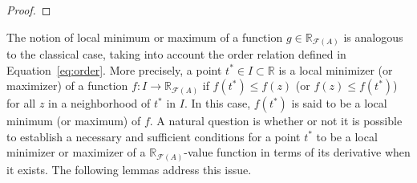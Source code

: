 \documentclass[12pt,a4paper]{article}
\newcommand{\RR}{\mathbb{R}}
\newcommand{\RFA}{\mathbb{R}_{\mathcal{F}(A)}}
\begin{document}
\begin{proof}
\end{proof}


The notion of local minimum or maximum of a function $g\in\RFA$ is analogous to the classical case, taking into account the order relation defined in Equation~\eqref{eq:order}. More precisely, a point $t^* \in I \subset \RR$ is  
a local minimizer (or maximizer) of a function $f:I\to \RFA$ if $f(t^*) \leq f(z)$ (or $f(z) \leq f(t^*)$) for all 
$z$ in a neighborhood of $t^*$ in $I$. In this case, $f(t^*)$ is said to be a local minimum (or maximum) of $f$. 
A natural question is whether or not it is possible to establish a necessary and sufficient conditions for a point $t^*$ to be a local minimizer or maximizer of a $\RFA$-value function in terms of its derivative when it exists. The following lemmas address this issue. 
\end{document}
